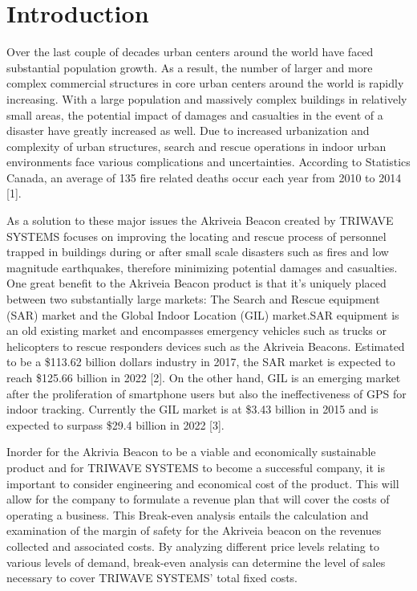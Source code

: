 

\setcounter{section}{0}
\section{Introduction}

\bigskip
Over the last couple of decades urban centers around the world have faced substantial population growth. As a result, the number of larger and more complex commercial structures in core urban centers around the world is rapidly increasing. With a large population and massively complex buildings in relatively small areas, the potential impact of damages and casualties in the event of a disaster have greatly increased as well. Due to increased urbanization and complexity of urban structures, search and rescue operations in indoor urban environments face various complications and uncertainties. According to Statistics Canada, an average of 135 fire related deaths occur each year from 2010 to 2014 [1]. 

\bigskip
As a solution to these major issues the Akriveia Beacon created by TRIWAVE SYSTEMS focuses on improving the locating and rescue process of personnel trapped in buildings during or after small scale disasters such as fires and low magnitude earthquakes, therefore minimizing potential damages and casualties. One great benefit to the Akriveia Beacon product is that it’s uniquely placed between two substantially large markets: The Search and Rescue equipment (SAR) market and the Global Indoor Location (GIL) market.SAR equipment is an old existing market and encompasses emergency vehicles such as trucks or helicopters to rescue responders devices such as the Akriveia Beacons. Estimated to be a \$113.62 billion dollars industry in 2017, the SAR market is expected to reach \$125.66 billion in 2022 [2]. On the other hand, GIL is an emerging market after the proliferation of smartphone users but also the ineffectiveness of GPS for indoor tracking. Currently the GIL market is at \$3.43 billion in 2015 and is expected to surpass \$29.4 billion in 2022 [3]. 

\bigskip
Inorder for the Akrivia Beacon to be a viable and economically sustainable product and for TRIWAVE SYSTEMS to become a successful company, it is important to consider engineering and economical cost of the product.  This will allow for the company to formulate a revenue plan that will cover the costs of operating a business. This Break-even analysis entails the calculation and examination of the margin of safety for the Akriveia beacon on the revenues collected and associated costs. By analyzing different price levels relating to various levels of demand, break-even analysis can determine the level of sales necessary to cover TRIWAVE SYSTEMS’ total fixed costs.
